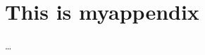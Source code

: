 \chapter{This is myappendix}\label{ch:myappendix}

\ldots

\instructionsappendices


\cleardoublepage

